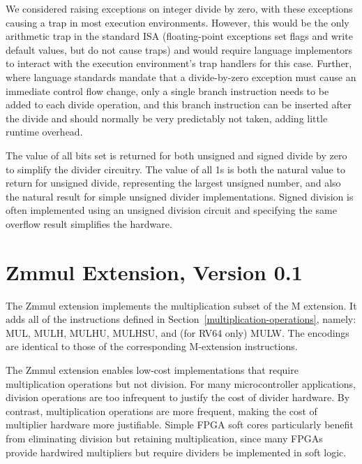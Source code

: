 \begin{commentary}
We considered raising exceptions on integer divide by zero, with these
exceptions causing a trap in most execution environments.  However,
this would be the only arithmetic trap in the standard ISA
(floating-point exceptions set flags and write default values, but do
not cause traps) and would require language implementors to interact
with the execution environment's trap handlers for this case.
Further, where language standards mandate that a divide-by-zero
exception must cause an immediate control flow change, only a single
branch instruction needs to be added to each divide operation, and
this branch instruction can be inserted after the divide and should
normally be very predictably not taken, adding little runtime
overhead.

The value of all bits set is returned for both unsigned and signed
divide by zero to simplify the divider circuitry.  The value of all 1s
is both the natural value to return for unsigned divide, representing
the largest unsigned number, and also the natural result for simple
unsigned divider implementations.  Signed division is often
implemented using an unsigned division circuit and specifying the same
overflow result simplifies the hardware.
\end{commentary}

\section{Zmmul Extension, Version 0.1}

The Zmmul extension implements the multiplication subset of the M extension.
It adds all of the instructions defined in Section~\ref{multiplication-operations},
namely: MUL, MULH, MULHU, MULHSU, and (for RV64 only) MULW.
The encodings are identical to those of the corresponding M-extension instructions.

\begin{commentary}
The Zmmul extension enables low-cost implementations that require
multiplication operations but not division.
For many microcontroller applications, division operations are too
infrequent to justify the cost of divider hardware.
By contrast, multiplication operations are more frequent, making the cost of
multiplier hardware more justifiable.
Simple FPGA soft cores particularly benefit from eliminating division but
retaining multiplication, since many FPGAs provide hardwired multipliers
but require dividers be implemented in soft logic.
\end{commentary}
